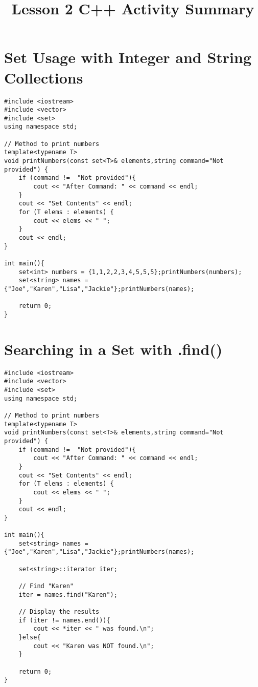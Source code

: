 \documentclass[12pt]{article}
\title{Lesson 2 C++ Activity Summary}
\author{}
\date{}
\begin{document}
\maketitle
\tableofcontents
\newpage

\section*{Set Usage with Integer and String Collections}
\begin{verbatim}
#include <iostream>
#include <vector>
#include <set>
using namespace std;

// Method to print numbers
template<typename T>
void printNumbers(const set<T>& elements,string command="Not provided") {
    if (command !=  "Not provided"){
        cout << "After Command: " << command << endl;
    }
    cout << "Set Contents" << endl;
    for (T elems : elements) {
        cout << elems << " ";
    }
    cout << endl;
}

int main(){
    set<int> numbers = {1,1,2,2,3,4,5,5,5};printNumbers(numbers);
    set<string> names = {"Joe","Karen","Lisa","Jackie"};printNumbers(names);

    return 0;
} 
\end{verbatim}


\section*{Searching in a Set with .find()}
\begin{verbatim}
#include <iostream>
#include <vector>
#include <set>
using namespace std;

// Method to print numbers
template<typename T>
void printNumbers(const set<T>& elements,string command="Not provided") {
    if (command !=  "Not provided"){
        cout << "After Command: " << command << endl;
    }
    cout << "Set Contents" << endl;
    for (T elems : elements) {
        cout << elems << " ";
    }
    cout << endl;
}

int main(){
    set<string> names = {"Joe","Karen","Lisa","Jackie"};printNumbers(names);

    set<string>::iterator iter;

    // Find "Karen"
    iter = names.find("Karen");

    // Display the results
    if (iter != names.end()){
        cout << *iter << " was found.\n";
    }else{
        cout << "Karen was NOT found.\n";
    }

    return 0;
} 
\end{verbatim}
\end{document}
